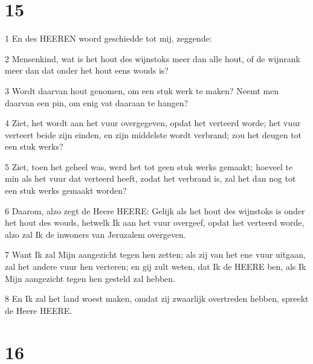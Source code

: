 \chapter{15}

\par 1 En des HEEREN woord geschiedde tot mij, zeggende:
\par 2 Mensenkind, wat is het hout des wijnstoks meer dan alle hout, of de wijnrank meer dan dat onder het hout eens wouds is?
\par 3 Wordt daarvan hout genomen, om een stuk werk te maken? Neemt men daarvan een pin, om enig vat daaraan te hangen?
\par 4 Ziet, het wordt aan het vuur overgegeven, opdat het verteerd worde; het vuur verteert beide zijn einden, en zijn middelste wordt verbrand; zou het deugen tot een stuk werks?
\par 5 Ziet, toen het geheel was, werd het tot geen stuk werks gemaakt; hoeveel te min als het vuur dat verteerd heeft, zodat het verbrand is, zal het dan nog tot een stuk werks gemaakt worden?
\par 6 Daarom, alzo zegt de Heere HEERE: Gelijk als het hout des wijnstoks is onder het hout des wouds, hetwelk Ik aan het vuur overgeef, opdat het verteerd worde, alzo zal Ik de inwoners van Jeruzalem overgeven.
\par 7 Want Ik zal Mijn aangezicht tegen hen zetten; als zij van het ene vuur uitgaan, zal het andere vuur hen verteren; en gij zult weten, dat Ik de HEERE ben, als Ik Mijn aangezicht tegen hen gesteld zal hebben.
\par 8 En Ik zal het land woest maken, omdat zij zwaarlijk overtreden hebben, spreekt de Heere HEERE.

\chapter{16}

